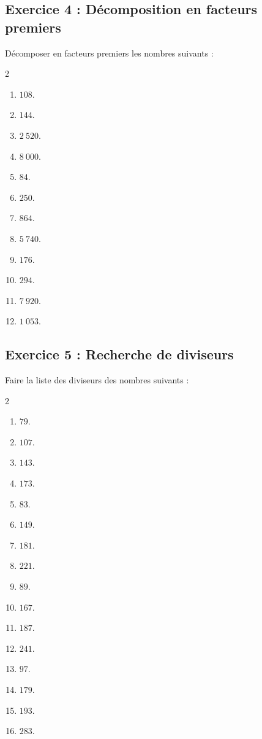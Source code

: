 \documentclass[14 pt]{extarticle}
\theoremstyle{plain}
\begin{document}
  \subsection*{Exercice 4 : Décomposition en facteurs premiers}
  Décomposer en facteurs premiers les nombres suivants : 
  \begin{multicols}{2}
  \begin{enumerate}
  
 \item $108$. 
 \item $144$. 
 \item $2~520$. 
 \item $8~000$. 
 \item $84$. 
 \item $250$. 
 \item $864$. 
 \item $5~740$. 
 \item $176$.
 \item $294$. 
 \item $7~920$. 
 \item $1~053$. 
  \end{enumerate}\end{multicols}
  
  \subsection*{Exercice 5 : Recherche de diviseurs }
  
  Faire la liste des diviseurs des nombres suivants : 
  \begin{multicols}{2}
   \begin{enumerate}
 \item $79$. 
 \item $107$. 
 \item $143$. 
 \item $173$. 
 \item $83$. 
 \item $149$. 
 \item $181$. 
 \item $221$. 
 \item $89$. 
 \item $167$. 
 \item $187$. 
 \item $241$. 
 \item $97$. 
 \item $179$. 
 \item $193$. 
 \item  $283$. 
 \end{enumerate}
  
 \end{multicols}
\end{document}
